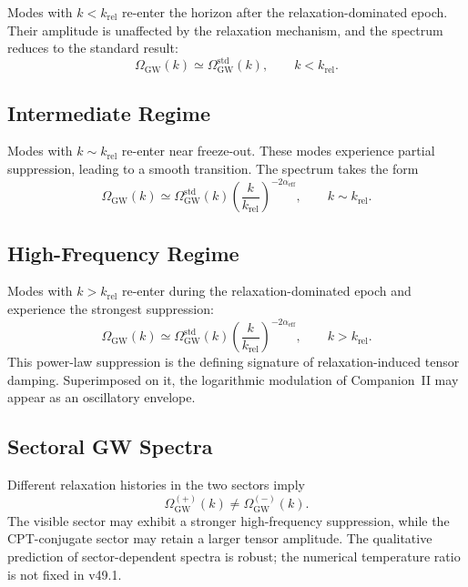 \documentclass[11pt,a4paper]{article}
\begin{document}
Modes with \(k < k_{\mathrm{rel}}\) re-enter the horizon after the
relaxation-dominated epoch. Their amplitude is unaffected by the
relaxation mechanism, and the spectrum reduces to the standard result:
\begin{equation}
  \Omega_{\mathrm{GW}}(k)
  \simeq
  \Omega_{\mathrm{GW}}^{\mathrm{std}}(k),
  \qquad
  k < k_{\mathrm{rel}}.
\end{equation}

\subsection{Intermediate Regime}

Modes with \(k \sim k_{\mathrm{rel}}\) re-enter near freeze-out. These
modes experience partial suppression, leading to a smooth transition. The
spectrum takes the form
\begin{equation}
  \Omega_{\mathrm{GW}}(k)
  \simeq
  \Omega_{\mathrm{GW}}^{\mathrm{std}}(k)
  \left(
    \frac{k}{k_{\mathrm{rel}}}
  \right)^{-2\alpha_{\mathrm{eff}}},
  \qquad
  k \sim k_{\mathrm{rel}}.
\end{equation}

\subsection{High-Frequency Regime}

Modes with \(k > k_{\mathrm{rel}}\) re-enter during the
relaxation-dominated epoch and experience the strongest suppression:
\begin{equation}
  \Omega_{\mathrm{GW}}(k)
  \simeq
  \Omega_{\mathrm{GW}}^{\mathrm{std}}(k)
  \left(
    \frac{k}{k_{\mathrm{rel}}}
  \right)^{-2\alpha_{\mathrm{eff}}},
  \qquad
  k > k_{\mathrm{rel}}.
\end{equation}
This power-law suppression is the defining signature of
relaxation-induced tensor damping. Superimposed on it, the logarithmic
modulation of Companion~II may appear as an oscillatory envelope.

\subsection{Sectoral GW Spectra}

Different relaxation histories in the two sectors imply
\begin{equation}
  \Omega_{\mathrm{GW}}^{(+)}(k)
  \neq
  \Omega_{\mathrm{GW}}^{(-)}(k).
\end{equation}
The visible sector may exhibit a stronger high-frequency suppression,
while the CPT-conjugate sector may retain a larger tensor amplitude. The
qualitative prediction of sector-dependent spectra is robust; the
numerical temperature ratio is not fixed in v49.1.
\end{document}
